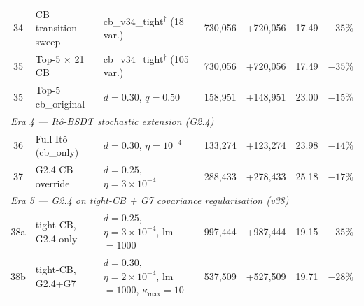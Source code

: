 \documentclass[11pt,oneside]{amsart}
\def\textbf#1{#1}%
\theoremstyle{plain}
\theoremstyle{definition}
\begin{document}
\begin{table}[htbp]
\begin{tabular}{c l l r r r r}
34 & CB transition sweep    & cb\_v34\_tight$^\dagger$ (18 var.) & 730{,}056 & +720{,}056 & 17.49 & $-35\%$ \\
35 & Top-5 $\times$ 21 CB  & cb\_v34\_tight$^\dagger$ (105 var.) & 730{,}056 & +720{,}056 & 17.49 & $-35\%$ \\
35 & Top-5 cb\_original     & $d{=}0.30$, $q{=}0.50$           & 158{,}951 &  +148{,}951 & \textbf{23.00} & $-15\%$ \\
\hline
\multicolumn{7}{l}{\textit{Era 4 — Itô-BSDT stochastic extension (G2.4)}} \\
36 & Full It\^o (cb\_only)  & $d{=}0.30$, $\eta{=}10^{-4}$    & 133{,}274 & +123{,}274 & 23.98 & $-14\%$ \\
37 & G2.4 CB override       & $d{=}0.25$, $\eta{=}3{\times}10^{-4}$ & 288{,}433 & +278{,}433 & \textbf{25.18} & $-17\%$ \\
\hline
\multicolumn{7}{l}{\textit{Era 5 --- G2.4 on tight-CB + G7 covariance regularisation (v38)}} \\
38a & tight-CB, G2.4 only    & $d{=}0.25$, $\eta{=}3{\times}10^{-4}$, lm$=1000$ & \textbf{997{,}444} & \textbf{+987{,}444} & 19.15 & $-35\%$ \\
\rowcolor[gray]{0.92}
38b & tight-CB, G2.4+G7      & $d{=}0.30$, $\eta{=}2{\times}10^{-4}$, lm$=1000$, $\kappa_{\max}{=}10$ & 537{,}509 & +527{,}509 & 19.71 & $-28\%$ \\
\hline
\end{tabular}
\end{table}
\end{document}
